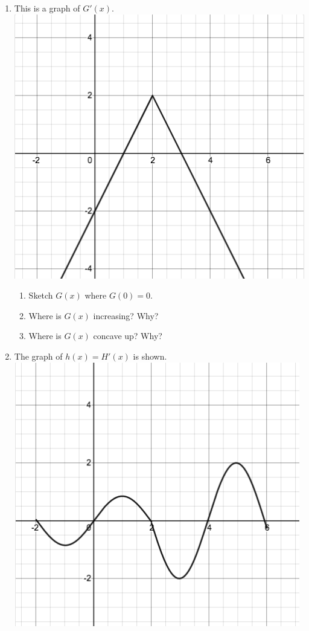 \documentclass[12pt]{article}
\begin{document}
\begin{enumerate}
\item This is a graph of $G'(x)$. \\
\includegraphics[scale=0.35]{6_1_2}

	\begin{enumerate}
	\item Sketch $G(x)$ where $G(0)=0$.
	\item Where is $G(x)$ increasing? Why?
	\vfill
	\item Where is $G(x)$ concave up? Why?
	\vfill
	\end{enumerate}



\item The graph of $h(x)=H'(x)$ is shown. \\
\includegraphics[scale=0.35]{6_1_3}
	\begin{enumerate}


\end{enumerate}
\end{enumerate}
\end{document}
